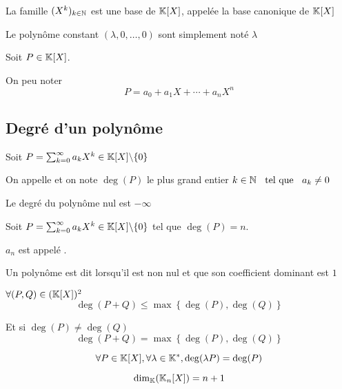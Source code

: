 \begin{prp}
  La famille $(X^k)_{k \in \mathbb{N}}$ est une base de $\mathbb{K}[X]$, appelée la base
  canonique de $\mathbb{K}[X]$
\end{prp}
  

\begin{dfn}
  Le polynôme constant $(\lambda, 0, \ldots, 0)$ sont simplement noté
  $\lambda$
\end{dfn}

\begin{dfn}
  Soit $P \in \mathbb{K}[X]$.

  On peu noter
  \[
    P = a_0 + a_1 X + \cdots + a_n X^n
  \]
\end{dfn}

\subsection{Degré d'un polynôme}

\begin{dfn}
  Soit $P = \sum^\infty_{k = 0} a_k X^k \in \mathbb{K}[X] \backslash \{0\}$

  On appelle  et on note $\deg(P)$ le plus grand entier
  $k \in \mathbb{N} \;\;\text{ tel que }\;\; a_k \neq 0$

  Le degré du polynôme nul est $- \infty$
\end{dfn}

\begin{dfn}
  Soit $P = \sum^\infty_{k = 0} a_k X^k \in \mathbb{K}[X] \backslash \{0\}$ tel que
  $\deg(P) = n$.

  $a_n$ est appelé .
\end{dfn}

\begin{dfn}
  Un polynôme est dit  lorsqu'il est non nul
  et que son coefficient dominant est $1$
\end{dfn}

\begin{prp}
  $\forall (P, Q) \in (\mathbb{K}[X])^2$
  \[
    \deg(P + Q) \leq \max \left\{ \deg(P), \deg(Q) \right\}
  \]

  Et si $\deg(P) \neq \deg(Q)$
  \[
    \deg(P + Q) = \max \left\{ \deg(P), \deg(Q) \right\}
  \]
\end{prp}

\begin{prp}
\[
  \forall P \in \mathbb{K}[X], \forall \lambda \in \mathbb{K}^*, \deg (\lambda P) = \deg(P)
\]
\end{prp}

\begin{cor}
  \[
    \dim_{\mathbb{K}}(\mathbb{K}_n[X]) = n + 1
  \]
\end{cor}

